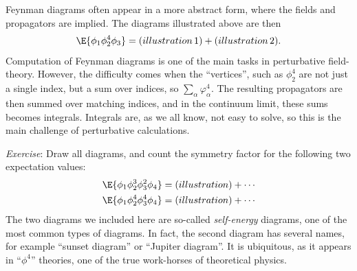 Feynman diagrams often appear in a more abstract form, where the fields and propagators are implied.
The diagrams illustrated above are then
%
\begin{align}
    \E{\phi_1 \phi_2^4 \phi_3} = (illustration\,1) + (illustration\,2).
\end{align}
%
Computation of Feynman diagrams is one of the main tasks in perturbative field-theory.
However, the difficulty comes when the ``vertices'', such as $\phi_2^4$ are not just a single index, but a sum over indices, so $\sum_\alpha \varphi_\alpha^4$.
The resulting propagators are then summed over matching indices, and in the continuum limit, these sums becomes integrals.
Integrals are, as we all know, not easy to solve, so this is the main challenge of perturbative calculations.

\begin{framed}\noindent
    \textit{Exercise}:
    Draw all diagrams, and count the symmetry factor for the following two expectation values:
    \begin{align}
        \E{\phi_1\phi_2^3\phi_3^2\phi_4} & = (illustration) +  \cdots\\
        \E{\phi_1\phi_2^4\phi_3^4\phi_4} & = (illustration) +  \cdots
    \end{align}
    The two diagrams we included here are so-called \emph{self-energy} diagrams, one of the most common types of diagrams.
    In fact, the second diagram has several names, for example ``sunset diagram'' or ``Jupiter diagram''.
    It is ubiquitous, as it appears in ``$\phi^4$'' theories, one of the true work-horses of theoretical physics.
\end{framed}

